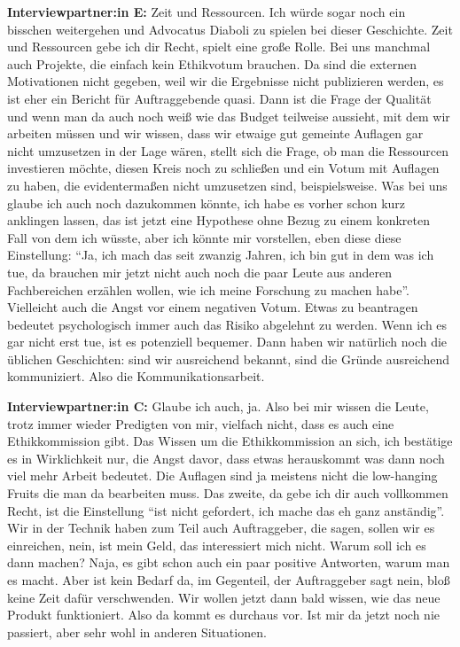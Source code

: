 \documentclass[a4paper,12pt,twoside,numbers=noendperiod]{scrreprt}
\begin{document}
\textbf{Interviewpartner:in E:} Zeit und Ressourcen. Ich würde sogar noch ein bisschen weitergehen und Advocatus Diaboli zu spielen bei dieser Geschichte. Zeit und Ressourcen gebe ich dir Recht, spielt eine große Rolle. Bei uns manchmal auch Projekte, die einfach kein Ethikvotum brauchen. Da sind die externen Motivationen nicht gegeben, weil wir die Ergebnisse nicht publizieren werden, es ist eher ein Bericht für Auftraggebende quasi. Dann ist die Frage der Qualität und wenn man da auch noch weiß wie das Budget teilweise aussieht, mit dem wir arbeiten müssen und wir wissen, dass wir etwaige gut gemeinte Auflagen gar nicht umzusetzen in der Lage wären, stellt sich die Frage, ob man die Ressourcen investieren möchte, diesen Kreis noch zu schließen und ein Votum mit Auflagen zu haben, die evidentermaßen nicht umzusetzen sind, beispielsweise. Was bei uns glaube ich auch noch dazukommen könnte, ich habe es vorher schon kurz anklingen lassen, das ist jetzt eine Hypothese ohne Bezug zu einem konkreten Fall von dem ich wüsste, aber ich könnte mir vorstellen, eben diese diese Einstellung: \enquote{Ja, ich mach das seit zwanzig Jahren, ich bin gut in dem was ich tue, da brauchen mir jetzt nicht auch noch die paar Leute aus anderen Fachbereichen erzählen wollen, wie ich meine Forschung zu machen habe}. Vielleicht auch die Angst vor einem negativen Votum. Etwas zu beantragen bedeutet psychologisch immer auch das Risiko abgelehnt zu werden. Wenn ich es gar nicht erst tue, ist es potenziell bequemer. Dann haben wir natürlich noch die üblichen Geschichten: sind wir ausreichend bekannt, sind die Gründe ausreichend kommuniziert. Also die Kommunikationsarbeit.

\textbf{Interviewpartner:in C:} Glaube ich auch, ja. Also bei mir wissen die Leute, trotz immer wieder Predigten von mir, vielfach nicht, dass es auch eine Ethikkommission gibt. Das Wissen um die Ethikkommission an sich, ich bestätige es in Wirklichkeit nur, die Angst davor, dass etwas herauskommt was dann noch viel mehr Arbeit bedeutet. Die Auflagen sind ja meistens nicht die low-hanging Fruits die man da bearbeiten muss. Das zweite, da gebe ich dir auch vollkommen Recht, ist die Einstellung \enquote{ist nicht gefordert, ich mache das eh ganz anständig}. Wir in der Technik haben zum Teil auch Auftraggeber, die sagen, sollen wir es einreichen, nein, ist mein Geld, das interessiert mich nicht. Warum soll ich es dann machen? Naja, es gibt schon auch ein paar positive Antworten, warum man es macht. Aber ist kein Bedarf da, im Gegenteil, der Auftraggeber sagt nein, bloß keine Zeit dafür verschwenden. Wir wollen jetzt dann bald wissen, wie das neue Produkt funktioniert. Also da kommt es durchaus vor. Ist mir da jetzt noch nie passiert, aber sehr wohl in anderen Situationen.
\end{document}
